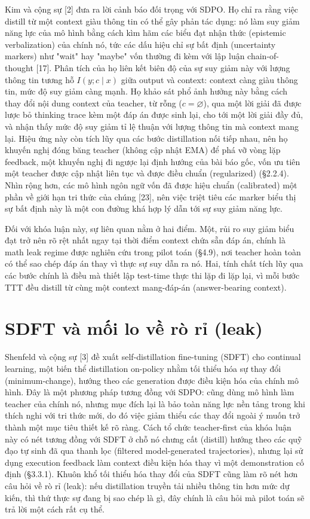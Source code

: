 Kim và cộng sự {[}2{]} đưa ra lời cảnh báo đối trọng với SDPO. Họ chỉ ra rằng việc distill từ một context giàu thông tin có thể gây phản tác dụng: nó làm suy giảm năng lực của mô hình bằng cách kìm hãm các biểu đạt nhận thức (epistemic verbalization) của chính nó, tức các dấu hiệu chỉ sự bất định (uncertainty markers) như "wait" hay "maybe" vốn thường đi kèm với lập luận chain-of-thought {[}17{]}. Phân tích của họ liên kết biên độ của sự suy giảm này với lượng thông tin tương hỗ \(I(y; c \mid x)\) giữa output và context: context càng giàu thông tin, mức độ suy giảm càng mạnh. Họ khảo sát phổ ảnh hưởng này bằng cách thay đổi nội dung context của teacher, từ rỗng (\(c = \varnothing\)), qua một lời giải đã được lược bỏ thinking trace kèm một đáp án được sinh lại, cho tới một lời giải đầy đủ, và nhận thấy mức độ suy giảm tỉ lệ thuận với lượng thông tin mà context mang lại. Hiệu ứng này còn tích lũy qua các bước distillation nối tiếp nhau, nên họ khuyến nghị đóng băng teacher (không cập nhật EMA) để phá vỡ vòng lặp feedback, một khuyến nghị đi ngược lại định hướng của bài báo gốc, vốn ưu tiên một teacher được cập nhật liên tục và được điều chuẩn (regularized) (§2.2.4). Nhìn rộng hơn, các mô hình ngôn ngữ vốn đã được hiệu chuẩn (calibrated) một phần về giới hạn tri thức của chúng {[}23{]}, nên việc triệt tiêu các marker biểu thị sự bất định này là một con đường khá hợp lý dẫn tới sự suy giảm năng lực.

Đối với khóa luận này, sự liên quan nằm ở hai điểm. Một, rủi ro suy giảm biểu đạt trở nên rõ rệt nhất ngay tại thời điểm context chứa sẵn đáp án, chính là math leak regime được nghiên cứu trong pilot toán (§4.9), nơi teacher hoàn toàn có thể sao chép đáp án thay vì thực sự suy dẫn ra nó. Hai, tính chất tích lũy qua các bước chính là điều mà thiết lập test-time thực thi lặp đi lặp lại, vì mỗi bước TTT đều distill từ cùng một context mang-đáp-án (answer-bearing context).

\section{SDFT và mối lo về rò rỉ (leak)}\label{sdft-and-the-leak-concern}

Shenfeld và cộng sự {[}3{]} đề xuất self-distillation fine-tuning (SDFT) cho continual learning, một biến thể distillation on-policy nhằm tối thiểu hóa sự thay đổi (minimum-change), hướng theo các generation được điều kiện hóa của chính mô hình. Đây là một phương pháp tương đồng với SDPO: cũng dùng mô hình làm teacher của chính nó, nhưng mục đích lại là bảo toàn năng lực nền tảng trong khi thích nghi với tri thức mới, do đó việc giảm thiểu các thay đổi ngoài ý muốn trở thành một mục tiêu thiết kế rõ ràng. Cách tổ chức teacher-first của khóa luận này có nét tương đồng với SDFT ở chỗ nó chưng cất (distill) hướng theo các quỹ đạo tự sinh đã qua thanh lọc (filtered model-generated trajectories), nhưng lại sử dụng execution feedback làm context điều kiện hóa thay vì một demonstration cố định (§3.3.1). Khuôn khổ tối thiểu hóa thay đổi của SDFT cũng làm rõ nét hơn câu hỏi về rò rỉ (leak): nếu distillation truyền tải nhiều thông tin hơn mức dự kiến, thì thứ thực sự đang bị sao chép là gì, đây chính là câu hỏi mà pilot toán sẽ trả lời một cách rất cụ thể.

